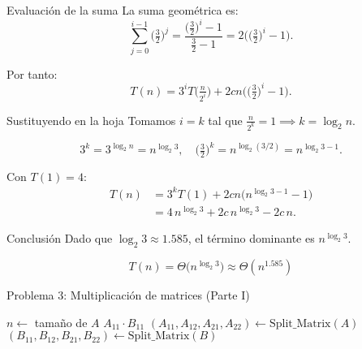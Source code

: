 \documentclass{beamer}
\begin{document}
\begin{frame}{Evaluación de la suma}
La suma geométrica es:
\[
\sum_{j=0}^{i-1}\Big(\tfrac{3}{2}\Big)^{j}
= \frac{\big(\tfrac{3}{2}\big)^{i}-1}{\tfrac{3}{2}-1}
= 2\Big(\big(\tfrac{3}{2}\big)^{i}-1\Big).
\]

Por tanto:
\[
T(n)=3^{i}T\!\big(\tfrac{n}{2^{i}}\big) + 2c n\Big(\big(\tfrac{3}{2}\big)^{i}-1\Big).
\]
\end{frame}

\begin{frame}{Sustituyendo en la hoja}
Tomamos $i=k$ tal que $\tfrac{n}{2^{k}}=1 \implies k=\log_2 n$.

\[
3^{k}=3^{\log_2 n}=n^{\log_2 3}, \quad
\Big(\tfrac{3}{2}\Big)^{k}=n^{\log_2(3/2)}=n^{\log_2 3 -1}.
\]

Con $T(1)=4$:
\[
\begin{aligned}
T(n) &= 3^{k}T(1) + 2c n\Big(n^{\log_2 3 -1}-1\Big)\\[6pt]
     &= 4\,n^{\log_2 3} + 2c\,n^{\log_2 3} - 2c\,n.
\end{aligned}
\]
\end{frame}

\begin{frame}{Conclusión}
Dado que $\log_2 3 \approx 1.585$, el término dominante es $n^{\log_2 3}$.

\[
\boxed{T(n)=\Theta\!\big(n^{\log_2 3}\big) \approx \Theta(n^{1.585})}
\]


\end{frame}



\begin{frame}{Problema 3: Multiplicación de matrices (Parte I)}
\scriptsize
\begin{algorithm}[H]
\caption{Multiplicación de matrices por divide y vencerás}
\begin{algorithmic}[1]
    \State $n \gets$ tamaño de $A$
      \State \Return $A_{11} \cdot B_{11}$
    \EndIf
    \State $(A_{11}, A_{12}, A_{21}, A_{22}) \gets \text{Split\_Matrix}(A)$
    \State $(B_{11}, B_{12}, B_{21}, B_{22}) \gets \text{Split\_Matrix}(B)$
\end{algorithmic}
\end{algorithm}
\end{frame}
\end{document}
